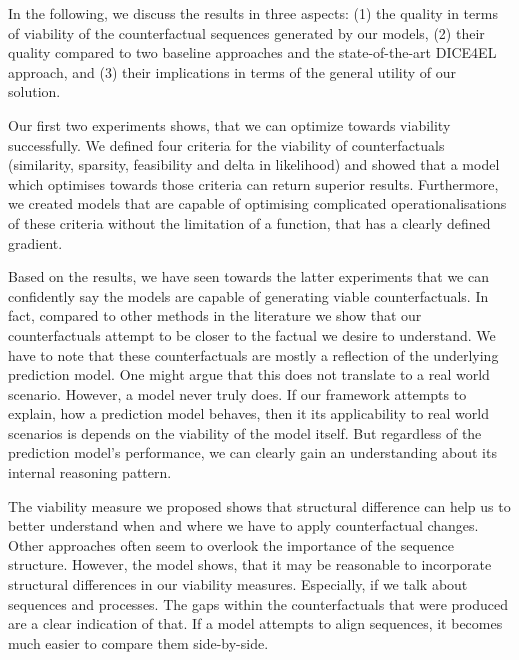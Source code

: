 \documentclass[./../../paper.tex]{subfiles}
\begin{document}
In the following, we discuss the results in three aspects: (1) the quality in terms of viability of the counterfactual sequences generated by our models, (2) their quality compared to two baseline approaches and the state-of-the-art DICE4EL approach, and (3) their implications in terms of the general utility of our solution.

Our first two experiments shows, that we can optimize towards viability successfully. We defined four criteria for the viability of counterfactuals (similarity, sparsity, feasibility and delta in likelihood) and showed that a model which optimises towards those criteria can return superior results. Furthermore, we created models that are capable of optimising complicated operationalisations of these criteria without the limitation of a function, that has a clearly defined gradient. 


Based on the results, we have seen towards the latter experiments that we can confidently say the models are capable of generating viable counterfactuals. In fact, compared to other methods in the literature we show that our counterfactuals attempt to be closer to the factual we desire to understand. We have to note that these counterfactuals are mostly a reflection of the underlying prediction model. One might argue that this does not translate to a real world scenario. However, a model never truly does. If our framework attempts to explain, how a prediction model behaves, then it its applicability to real world scenarios is depends on the viability of the model itself. But regardless of the prediction model's performance, we can clearly gain an understanding about its internal reasoning pattern.

The viability measure we proposed shows that structural difference can help us to better understand when and where we have to apply counterfactual changes. Other approaches often seem to overlook the importance of the sequence structure. However, the  model shows, that it may be reasonable to incorporate structural differences in our viability measures. Especially, if we talk about sequences and processes. The gaps within the counterfactuals that were produced are a clear indication of that. If a model attempts to align sequences, it becomes much easier to compare them side-by-side.  
\end{document}
